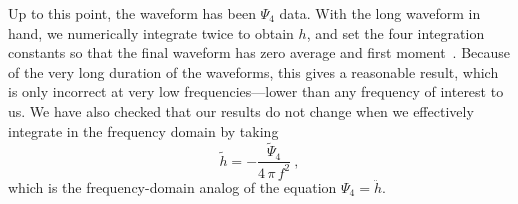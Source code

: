 Up to this point, the waveform has been $\Psi_{4}$ data.  With the
long waveform in hand, we numerically integrate twice to obtain $h$,
and set the four integration constants so that the final waveform has
zero average and first moment~\cite{Pfeiffer-Brown-etal:2007}.
Because of the very long duration of the waveforms, this gives a
reasonable result, which is only incorrect at very low
frequencies---lower than any frequency of interest to us.  We have
also checked that our results do not change when we effectively
integrate in the frequency domain by taking
\begin{equation}
  \label{eq:PsiFourIntegration}
  \tilde{h} = -\frac{\tilde{\Psi}_{4}}{4\,\pi\, f^{2}}\ ,
\end{equation}
which is the frequency-domain analog of the equation $\Psi_{4} =
\ddot{h}$.
\fi

